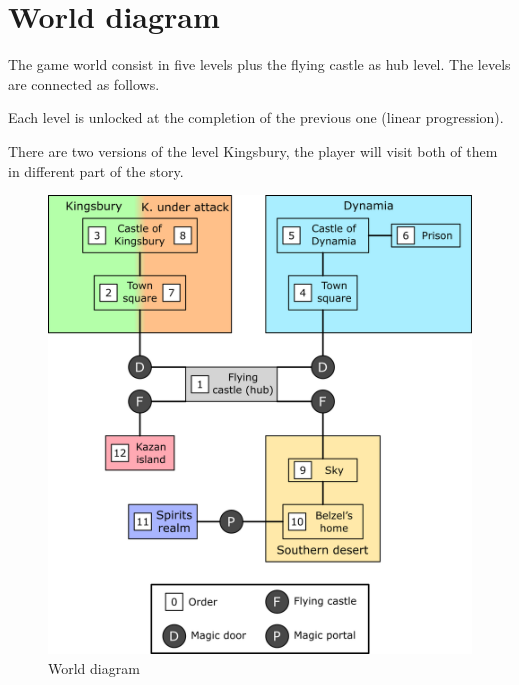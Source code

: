 \pagebreak %

\section{World diagram}

The game world consist in five levels plus the flying castle as hub level. The levels are connected as follows.

Each level is unlocked at the completion of the previous one (linear progression).

There are two versions of the level Kingsbury, the player will visit both of them in different part of the story.

\begin{figure}[H]
  \centering
  \includegraphics[width=\textwidth]{Images/Diagrams/worldDiagram}
  \caption{World diagram}
\end{figure}
